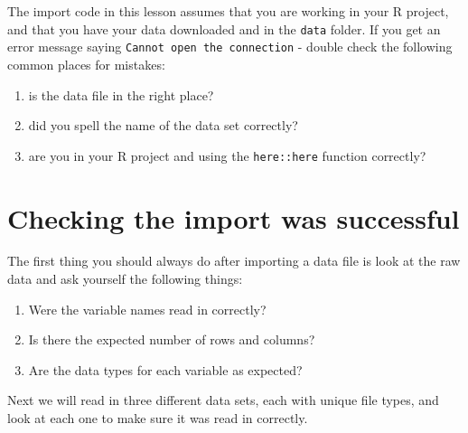 \documentclass[
  letterpaper,
  DIV=11,
  numbers=noendperiod,
  oneside]{scrreprt}
\providecommand{\tightlist}{%
  \setlength{\itemsep}{0pt}\setlength{\parskip}{0pt}}\usepackage{longtable,booktabs,array}
\begin{document}
\begin{tcolorbox}[enhanced jigsaw, bottomrule=.15mm, colback=white, colframe=quarto-callout-important-color-frame, toprule=.15mm, coltitle=black, rightrule=.15mm, opacitybacktitle=0.6, colbacktitle=quarto-callout-important-color!10!white, toptitle=1mm, leftrule=.75mm, breakable, bottomtitle=1mm, titlerule=0mm, title=\textcolor{quarto-callout-important-color}{\faExclamation}\hspace{0.5em}{Cannot open the Connection}, arc=.35mm, left=2mm, opacityback=0]

The import code in this lesson assumes that you are working in your R
project, and that you have your data downloaded and in the \texttt{data}
folder. If you get an error message saying
\texttt{Cannot\ open\ the\ connection} - double check the following
common places for mistakes:

\begin{enumerate}
\def\labelenumi{\arabic{enumi}.}
\tightlist
\item
  is the data file in the right place?
\item
  did you spell the name of the data set correctly?
\item
  are you in your R project and using the \texttt{here::here} function
  correctly?
\end{enumerate}

\end{tcolorbox}

\section{Checking the import was
successful}\label{checking-the-import-was-successful}

The first thing you should always do after importing a data file is look
at the raw data and ask yourself the following things:

\begin{enumerate}
\def\labelenumi{\arabic{enumi}.}
\tightlist
\item
  Were the variable names read in correctly?
\item
  Is there the expected number of rows and columns?
\item
  Are the data types for each variable as expected?
\end{enumerate}

Next we will read in three different data sets, each with unique file
types, and look at each one to make sure it was read in correctly.
\end{document}
